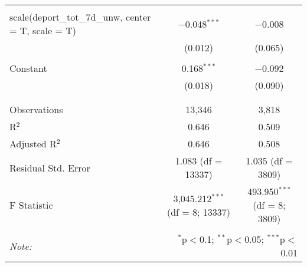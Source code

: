 \begin{table}[!htbp]
\begin{tabular}{@{\extracolsep{5pt}}lcc}
  & & \\ 
 scale(deport\_tot\_7d\_unw, center = T, scale = T) & $-$0.048$^{***}$ & $-$0.008 \\ 
  & (0.012) & (0.065) \\ 
  & & \\ 
 Constant & 0.168$^{***}$ & $-$0.092 \\ 
  & (0.018) & (0.090) \\ 
  & & \\ 
\hline \\[-1.8ex] 
Observations & 13,346 & 3,818 \\ 
R$^{2}$ & 0.646 & 0.509 \\ 
Adjusted R$^{2}$ & 0.646 & 0.508 \\ 
Residual Std. Error & 1.083 (df = 13337) & 1.035 (df = 3809) \\ 
F Statistic & 3,045.212$^{***}$ (df = 8; 13337) & 493.950$^{***}$ (df = 8; 3809) \\ 
\hline 
\hline \\[-1.8ex] 
\textit{Note:}  & \multicolumn{2}{r}{$^{*}$p$<$0.1; $^{**}$p$<$0.05; $^{***}$p$<$0.01} \\ 
\end{tabular} 
\end{table} 

